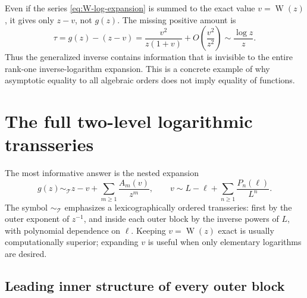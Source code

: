 \documentclass[11pt,oneside]{article}
\theoremstyle{plain}
\theoremstyle{definition}
\theoremstyle{remark}
\newcommand{\W}{\operatorname{W}}
\newcommand{\Tcal}{\mathcal{T}}
\begin{document}
\begin{warningbox}[title={What the complete slow expansion still does not know}]
Even if the series \eqref{eq:W-log-expansion} is summed to the exact value
\(v=\W(z)\), it gives only \(z-v\), not \(g(z)\).  The missing positive amount
is
\[
 \tau=g(z)-(z-v)
 =\frac{v^2}{z(1+v)}+O\!\left(\frac{v^2}{z^2}\right)
 \sim\frac{\log z}{z}.
\]
Thus the generalized inverse contains information that is invisible to the
entire rank-one inverse-logarithm expansion.  This is a concrete example of why
asymptotic equality to all algebraic orders does not imply equality of
functions.
\end{warningbox}

\section{The full two-level logarithmic transseries}
\label{sec:full-transseries}

The most informative answer is the nested expansion
\begin{equation}
 \boxed{
 g(z)\sim_{\Tcal}z-v+\sum_{m\ge1}\frac{A_m(v)}{z^m},
 \qquad
 v\sim L-\ell+\sum_{n\ge1}\frac{P_n(\ell)}{L^n}.}
 \label{eq:nested-transseries}
\end{equation}
The symbol \(\sim_{\Tcal}\) emphasizes a lexicographically ordered transseries:
first by the outer exponent of \(z^{-1}\), and inside each outer block by the
inverse powers of \(L\), with polynomial dependence on \(\ell\).  Keeping
\(v=\W(z)\) exact is usually computationally superior; expanding \(v\) is
useful when only elementary logarithms are desired.

\subsection{Leading inner structure of every outer block}
\end{document}
